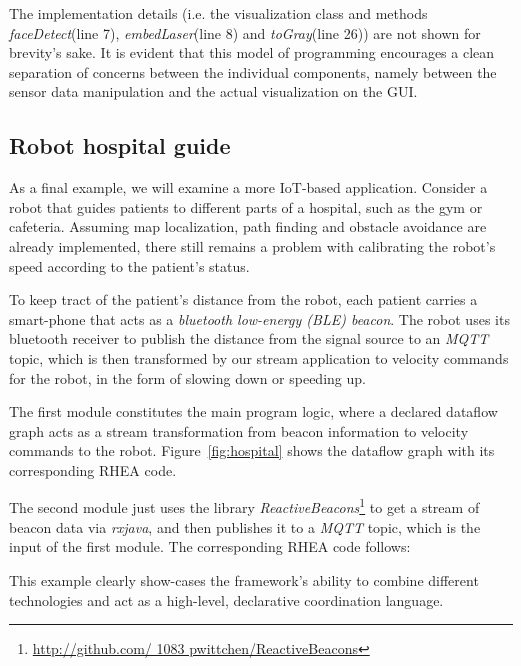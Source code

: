\documentclass[sigplan,screen]{acmart}
\begin{document}

The implementation details (i.e. the visualization class and methods
\textit{faceDetect}(line 7), \textit{embedLaser}(line 8) and
\textit{toGray}(line 26)) are not shown for brevity's sake. It is evident that
this model of programming encourages a clean separation of concerns between the
individual components, namely between the sensor data manipulation and the
actual visualization on the GUI.

\subsection{Robot hospital guide}

As a final example, we will examine a more IoT-based application. Consider a
robot that guides patients to different parts of a hospital, such as the gym or
cafeteria. Assuming map localization, path finding and obstacle avoidance are
already implemented, there still remains a problem with calibrating the robot's
speed according to the patient's status.

To keep tract of the patient's distance from the robot, each patient carries a
smart-phone that acts as a \textit{bluetooth low-energy (BLE) beacon}. The robot
uses its bluetooth receiver to publish the distance from the signal source to an
\textit{MQTT} topic, which is then transformed by our stream application to
velocity commands for the robot, in the form of slowing down or speeding up.

The first module constitutes the main program logic, where a declared dataflow
graph acts as a stream transformation from beacon information to velocity
commands to the robot. Figure~\ref{fig:hospital} shows the dataflow graph with
its corresponding \textsc{RHEA} code.


The second module just uses the library \textit{ReactiveBeacons}\footnote{\url{http://github.com/ 1083 pwittchen/ReactiveBeacons}}
to get a stream of beacon data via \textit{rxjava}, and then publishes it to a \textit{MQTT} topic,
which is the input of the first module. The corresponding \textsc{RHEA} code
follows:

This example clearly show-cases the framework's ability to combine different
technologies and act as a high-level, declarative coordination language.
\end{document}
